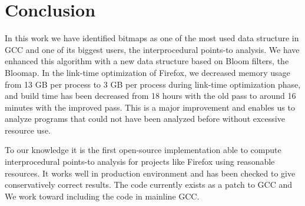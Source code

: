 \chapter*{Conclusion}

In this work we have identified bitmaps as one of the most used data
structure in GCC and one of its biggest users, the interprocedural
points-to analysis. We have enhanced this algorithm with a new data structure
based on Bloom filters, the Bloomap. In the link-time optimization of Firefox,
we decreased memory usage from 13 GB per process to 3 GB per process during
link-time optimization phase, and build time  has been decreased from 18 hours
with the old pass to around 16 minutes with the improved pass. This is a major
improvement and enables us to analyze programs that could not have been
analyzed before without excessive resource use.

To our knowledge it is the first open-source implementation able to compute
interprocedural points-to analysis for projects like Firefox using reasonable
resources.  It works well in production environment and has been checked to
give conservatively correct results.  The code currently exists as a patch to
GCC and We work toward including the code in mainline GCC.
